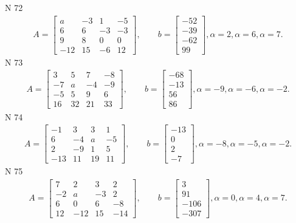 \documentclass[11pt]{report}
\begin{document}
N 72
\begin{align*}
 A = \left[\begin{matrix}a & -3 & 1 & -5\\6 & 6 & -3 & -3\\9 & 8 & 0 & 0\\-12 & 15 & -6 & 12\end{matrix}\right],
    \qquad b = \left[\begin{matrix}-52\\-39\\-62\\99\end{matrix}\right], \alpha = 2, \alpha = 6, \alpha = 7. 
 \end{align*}
N 73
\begin{align*}
 A = \left[\begin{matrix}3 & 5 & 7 & -8\\-7 & a & -4 & -9\\-5 & 5 & 9 & 6\\16 & 32 & 21 & 33\end{matrix}\right],
    \qquad b = \left[\begin{matrix}-68\\-13\\56\\86\end{matrix}\right], \alpha = -9, \alpha = -6, \alpha = -2. 
 \end{align*}
N 74
\begin{align*}
 A = \left[\begin{matrix}-1 & 3 & 3 & 1\\6 & -4 & a & -5\\2 & -9 & 1 & 5\\-13 & 11 & 19 & 11\end{matrix}\right],
    \qquad b = \left[\begin{matrix}-13\\0\\2\\-7\end{matrix}\right], \alpha = -8, \alpha = -5, \alpha = -2. 
 \end{align*}
N 75
\begin{align*}
 A = \left[\begin{matrix}7 & 2 & 3 & 2\\-2 & a & -3 & 2\\6 & 0 & 6 & -8\\12 & -12 & 15 & -14\end{matrix}\right],
    \qquad b = \left[\begin{matrix}3\\91\\-106\\-307\end{matrix}\right], \alpha = 0, \alpha = 4, \alpha = 7. 
 \end{align*}
\end{document}
